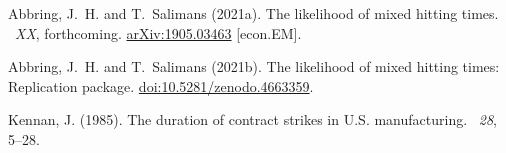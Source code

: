 \documentclass[fleqn,12pt]{article}
\begin{document}
\begin{thebibliography}{}
Abbring, J.~H. and T.~Salimans (2021a).
\newblock The likelihood of mixed hitting times.
~{\em XX\/}, forthcoming.
\newblock \href{https://arxiv.org/abs/1905.03463}{arXiv:1905.03463} [econ.EM].

Abbring, J.~H. and T.~Salimans (2021b).
\newblock The likelihood of mixed hitting times: Replication package.
\newblock \href{https://doi.org/10.5281/zenodo.4663359}{doi:10.5281/zenodo.4663359}.

Kennan, J. (1985).
\newblock The duration of contract strikes in {U.S.} manufacturing.
~{\em 28}, 5--28.

\end{thebibliography}
\end{document}
